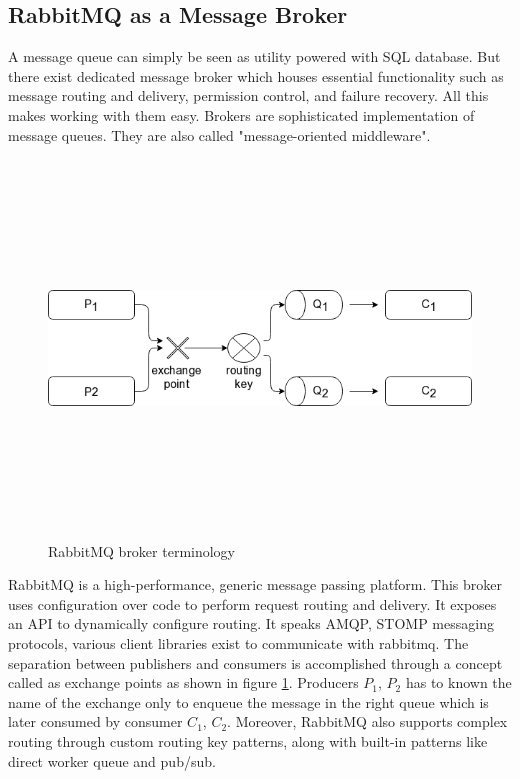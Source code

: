 \subsection{RabbitMQ as a Message Broker}
A message queue can simply be seen as utility powered with SQL database. But there exist dedicated message
broker which houses essential functionality such as message routing and delivery, permission control, and
failure recovery. All this makes working with them easy. Brokers are sophisticated implementation of
message queues. They are also called "message-oriented middleware".
\begin{figure}[h!]
  \centering
  \includegraphics[width=14cm,height=10cm,keepaspectratio]{../media/crawler/rmq_exchange.png}
  \caption{RabbitMQ broker terminology}
  \label{fig:mqexchange}
\end{figure}

\noindent
RabbitMQ is a high-performance, generic message passing platform. This broker uses configuration over code
to perform request routing and delivery. It exposes an API to dynamically configure routing. It speaks
AMQP, STOMP messaging protocols, various client libraries exist to communicate with rabbitmq. The
separation between publishers and consumers is accomplished through a concept called as exchange points as
shown in figure \ref{fig:mqexchange}. Producers $P_1$, $P_2$ has to known the name of the exchange only to
enqueue the message in the right queue which is later consumed by consumer $C_1$, $C_2$. Moreover, RabbitMQ
also supports complex routing through custom routing key patterns, along with built-in patterns like
direct worker queue and pub/sub.